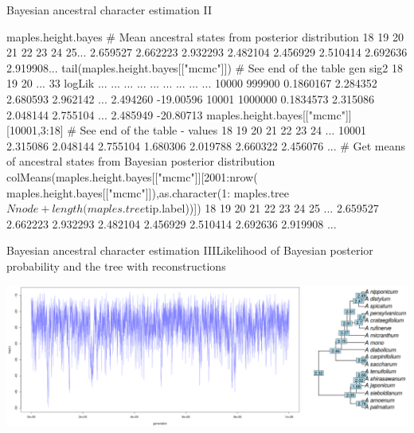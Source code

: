 \documentclass[compress, xelatex, 11pt, xcolor=svgnames, aspectratio=169,
	hyperref={
		bookmarks=true,
		unicode=true,
		colorlinks=true,
		pdftitle={Molecular data in R},
		plainpages=false,
		pdfauthor={Vojtech Zeisek},
		pdfsubject={Course about phylogeny and evolution in R},
		pdfcreator={XeLaTeX},
		pdfkeywords={R, evolution, phylogeny, molecular data},
		linkcolor=Crimson, %
		anchorcolor=Magenta, %
		citecolor=Magenta, %
		filecolor=Magenta, %
		menucolor=Magenta, %
		urlcolor=DodgerBlue, %
		},
	url={hyphens, lowtilde} %
	]{beamer}
\begin{document}
\begin{frame}[fragile]{Bayesian ancestral character estimation II}
	\begin{spluscode}
    maples.height.bayes # Mean ancestral states from posterior distribution
          18       19       20       21       22       23       24       25...
    2.659527 2.662223 2.932293 2.482104 2.456929 2.510414 2.692636 2.919908...
    tail(maples.height.bayes[["mcmc"]]) # See end of the table
              gen      sig2       18       19       20 ...       33    logLik
       ...     ...       ...      ...      ...      ... ...      ...       ...
    10000  999900 0.1860167 2.284352 2.680593 2.962142 ... 2.494260 -19.00596
    10001 1000000 0.1834573 2.315086 2.048144 2.755104 ... 2.485949 -20.80713
    maples.height.bayes[["mcmc"]][10001,3:18] # See end of the table - values
                18       19       20       21       22       23       24 ...
    10001 2.315086 2.048144 2.755104 1.680306 2.019788 2.660322 2.456076 ...
    # Get means of ancestral states from Bayesian posterior distribution
    colMeans(maples.height.bayes[["mcmc"]][2001:nrow(
      maples.height.bayes[["mcmc"]]),as.character(1:
      maples.tree$Nnode+length(maples.tree$tip.label))])
          18       19       20       21       22       23       24       25 ...
    2.659527 2.662223 2.932293 2.482104 2.456929 2.510414 2.692636 2.919908 ...
	\end{spluscode}
\end{frame}

\begin{frame}{Bayesian ancestral character estimation III}{Likelihood of Bayesian posterior probability and the tree with reconstructions}
	\begin{center}
		\includegraphics[width=\textwidth]{ancbayes.png}
	\end{center}
\end{frame}
\end{document}
